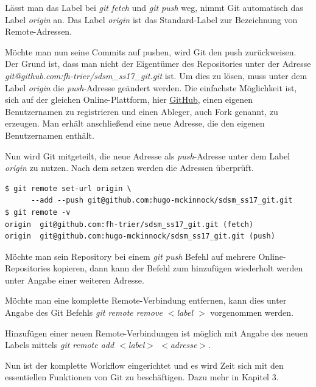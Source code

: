 \begin{info-popup}
  Lässt man das Label bei \textit{git fetch} und \textit{git push} weg, nimmt Git automatisch das Label \textit{origin} an. Das Label \textit{origin} ist das Standard-Label zur Bezeichnung von Remote-Adressen.
\end{info-popup}

Möchte man nun seine Commits auf pushen, wird Git den push zurückweisen. Der Grund ist, dass man nicht der Eigentümer des Repositories unter der Adresse \textit{git@github.com:fh-trier/sdsm\_ss17\_git.git} ist. Um dies zu lösen, muss unter dem Label \textit{origin} die \textit{push}-Adresse geändert werden. Die einfachste Möglichkeit ist, sich auf der gleichen Online-Plattform, hier \href{https://github.com}{GitHub}, einen eigenen Benutzernamen zu registrieren und einen Ableger, auch Fork genannt, zu erzeugen. Man erhält anschließend eine neue Adresse, die den eigenen Benutzernamen enthält.

Nun wird Git mitgeteilt, die neue Adresse als \textit{push}-Adresse unter dem Label \textit{origin} zu nutzen. Nach dem setzen werden die Adressen überprüft.

\begin{verbatim}
$ git remote set-url origin \
      --add --push git@github.com:hugo-mckinnock/sdsm_ss17_git.git
$ git remote -v
origin	git@github.com:fh-trier/sdsm_ss17_git.git (fetch)
origin	git@github.com:hugo-mckinnock/sdsm_ss17_git.git (push)
\end{verbatim}

\begin{info-popup}
  Möchte man sein Repository bei einem \textit{git push} Befehl auf mehrere Online-Repositories kopieren, dann kann der Befehl zum hinzufügen wiederholt werden unter Angabe einer weiteren Adresse.
\end{info-popup}

Möchte man eine komplette Remote-Verbindung entfernen, kann dies unter Angabe des Git Befehls \textit{git remote remove  $ < $label $ > $} vorgenommen werden.

Hinzufügen einer neuen Remote-Verbindungen ist möglich mit Angabe des neuen Labels mittels \textit{git remote add $ < $label$ > $ $ < $adresse$ > $}.

Nun ist der komplette Workflow eingerichtet und es wird Zeit sich mit den essentiellen Funktionen von Git zu beschäftigen. Dazu mehr in Kapitel 3.
